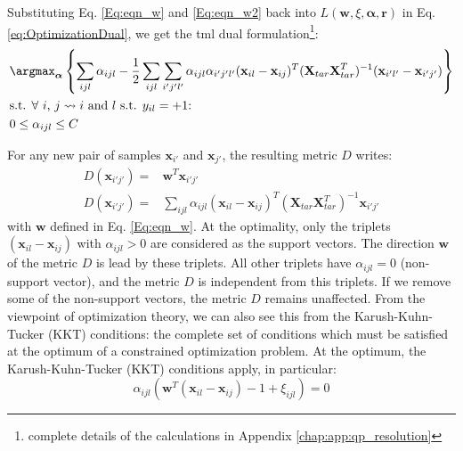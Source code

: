 \noindent Substituting Eq. \ref{Eq:eqn_w} and \ref{Eq:eqn_w2} back into $L(\textbf{w},\xi,\boldsymbol{\alpha},\textbf{r})$ in Eq. \ref{eq:OptimizationDual}, we get the {\sc tml} dual formulation\footnote{complete details of the calculations in Appendix \ref{chap:app:qp_resolution}}:
\begin{align}
&\displaystyle \argmax_{\boldsymbol{\alpha}} \left\lbrace 
\sum\limits_{ijl} \alpha_{ijl} 
- \frac{1}{2} \sum\limits_{ijl} \sum\limits_{i'j'l'}
\alpha_{ijl} \alpha_{i'j'l'}
(\textbf{x}_{il}-\textbf{x}_{ij})^T
(\textbf{X}_{tar} \textbf{X}_{tar}^T)^{-1}
(\textbf{x}_{i'l'}-\textbf{x}_{i'j'}) \right\rbrace \label{eq:OptimDual} \\
&\text{s.t. $\forall$ $i$, $j \rightsquigarrow i$ and $l$ s.t. $y_{il}=+1$:} \nonumber \\
& 0 \leq \alpha_{ijl} \leq C
\label{eq:OptimDualconstraint}
\end{align}

\noindent For any new pair of samples $\textbf{x}_{i'}$ and $\textbf{x}_{j'}$, the resulting metric $D$ writes: 
\begin{align}
D(\textbf{x}_{i'j'}) = & \textbf{w}^T \textbf{x}_{i'j'} \label{eq:D1} \\
D(\textbf{x}_{i'j'}) = & \sum\limits_{ijl} \alpha_{ijl} 
(\textbf{x}_{il}-\textbf{x}_{ij})^T
(\textbf{X}_{tar}\textbf{X}_{tar}^T)^{-1}
\textbf{x}_{i'j'}
\label{eq:D1_2}
\end{align}
with $\textbf{w}$ defined in Eq. \ref{Eq:eqn_w}. At the optimality, only the triplets $(\textbf{x}_{il}-\textbf{x}_{ij})$ with $\alpha_{ijl} > 0$ are considered as the support vectors. The direction $\textbf{w}$ of the metric $D$ is lead by these triplets. All other triplets have $\alpha_{ijl} = 0$ (non-support vector), and the metric $D$ is independent from this triplets. If we remove some of the non-support vectors, the metric $D$ remains unaffected. From the viewpoint of optimization theory, we can also see this from the Karush-Kuhn-Tucker (KKT) conditions: the complete set of conditions which must be satisfied at the optimum of a constrained optimization problem. At the optimum, the Karush-Kuhn-Tucker (KKT) conditions apply, in particular:
\begin{equation*}
\alpha_{ijl} (\textbf{w}^T (\textbf{x}_{il}-\textbf{x}_{ij}) - 1 + \xi_{ijl}) = 0
\end{equation*}

